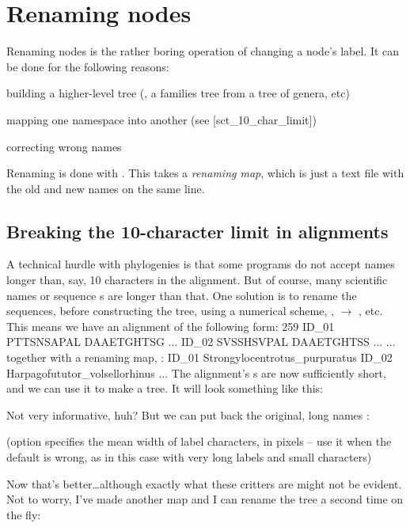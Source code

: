 
\section[sct_rename]{Renaming nodes}


Renaming nodes is the rather boring operation of changing a node's label. It
can be done \eg{} for the following reasons:
\startitemize
	\item building a higher-level tree (\ie, a families tree from a tree of genera, etc)
	\item mapping one namespace into another (see \in{}[sct_10_char_limit])
	\item correcting wrong names
\stopitemize

\noindent{}Renaming is done with \rename. This takes a {\em renaming map},
which is just a text file with the old and new names on the same line.

\subsection[sct_10_char_limit]{Breaking the 10-character limit in \phylip{} alignments}


A technical hurdle with phylogenies is that some programs do not accept names
longer than, say, 10 characters in the \phylip{} alignment. But of
course, many scientific names or sequence s are longer than that.
One solution is to rename the sequences, before constructing the tree, using a
numerical scheme, \eg{},  $\rightarrow$
, etc. This means we have an alignment of the following form:
 259
ID_01     PTTSNSAPAL DAAETGHTSG ...
ID_02     SVSSHSVPAL DAAETGHTSS ...
...
\stoptyping
together with a renaming map, :
\starttyping
ID_01	Strongylocentrotus_purpuratus
ID_02	Harpagofututor_volsellorhinus
...
\stoptyping
The alignment's s are now sufficiently short, and we can use it to
make a tree. It will look something like this:


\noindent{}Not very informative, huh? But we can put back the original, long
names :

(option  specifies the mean width of label characters, in
pixels -- use it when the default is wrong, as in this case with very long
labels and small characters)

\noindent{}Now that's better\ldots although exactly what these critters are
might not be evident. Not to worry, I've made another map and I can rename the
tree a second time on the fly:

